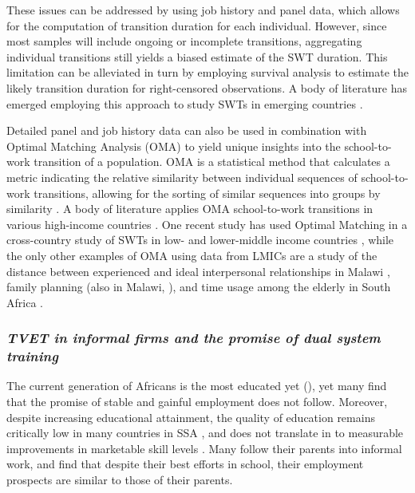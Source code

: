 \documentclass[
  a4paper, twoside, 12pt]{book}
\begin{document}
These issues can be addressed by using job history and panel data, which allows for the computation of transition duration for each individual. However, since most samples will include ongoing or incomplete transitions, aggregating individual transitions still yields a biased estimate of the SWT duration. This limitation can be alleviated in turn by employing survival analysis to estimate the likely transition duration for right-censored observations. A body of literature has emerged employing this approach to study SWTs in emerging countries \autocites[e.g.][]{khan2013,nordman2015,manacorda2017}.

Detailed panel and job history data can also be used in combination with Optimal Matching Analysis (OMA) to yield unique insights into the school-to-work transition of a population. OMA is a statistical method that calculates a metric indicating the relative similarity between individual sequences of school-to-work transitions, allowing for the sorting of similar sequences into groups by similarity \autocite{elzinga2003}. A body of literature applies OMA school-to-work transitions in various high-income countries \autocite{schoon2001,mcvicar2002,brzinsky-fay2007,quintini2009,brzinsky-fay2014,brzinsky-fay2016,middeldorp2019}. One recent study has used Optimal Matching in a cross-country study of SWTs in low- and lower-middle income countries \autocite{pesando2021}, while the only other examples of OMA using data from LMICs are a study of the distance between experienced and ideal interpersonal relationships in Malawi \autocite{frye2015}, family planning (also in Malawi, \textcite{furnas2016}), and time usage among the elderly in South Africa \autocite{grapsa2016}.

\hypertarget{tvet-in-informal-firms-and-the-promise-of-dual-system-training}{%
\subsubsection*{\texorpdfstring{\emph{TVET in informal firms and the promise of dual system training}}{TVET in informal firms and the promise of dual system training}}\label{tvet-in-informal-firms-and-the-promise-of-dual-system-training}}

The current generation of Africans is the most educated yet (\textcite{filmer2014}), yet many find that the promise of stable and gainful employment does not follow. Moreover, despite increasing educational attainment, the quality of education remains critically low in many countries in SSA \autocite{worldbank2018}, and does not translate in to measurable improvements in marketable skill levels \autocite{filmer2020}. Many follow their parents into informal work, and find that despite their best efforts in school, their employment prospects are similar to those of their parents.
\end{document}
